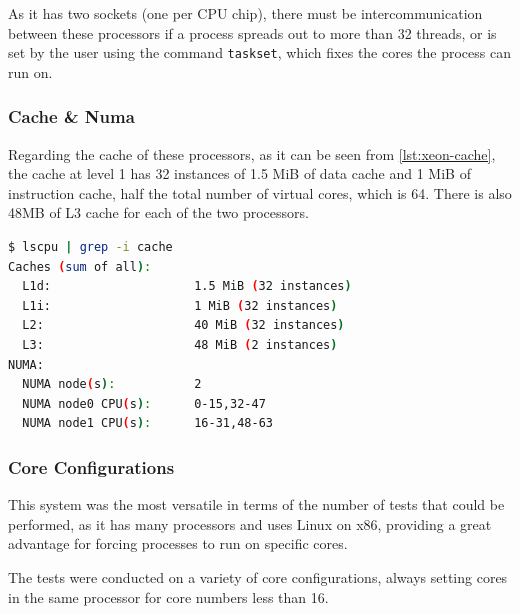 As it has two sockets (one per CPU chip), there must be intercommunication between these processors if a process spreads out to more than 32 threads, or is set by the user using the command \texttt{taskset}, which fixes the cores the process can run on.


\subsubsection{Cache \& Numa}
Regarding the cache of these processors, as it can be seen from \autoref{lst:xeon-cache}, the cache at level 1 has 32 instances of 1.5 MiB of data cache and 1 MiB of instruction cache, half the total number of virtual cores, which is 64. There is also 48MB of L3 cache for each of the two processors.

\begin{lstlisting}[language=bash, caption={Cache of the Intel Xeon Gold 6326}, label={lst:xeon-cache}]
$ lscpu | grep -i cache
Caches (sum of all):
  L1d:                    1.5 MiB (32 instances)
  L1i:                    1 MiB (32 instances)
  L2:                     40 MiB (32 instances)
  L3:                     48 MiB (2 instances)
NUMA:
  NUMA node(s):           2
  NUMA node0 CPU(s):      0-15,32-47
  NUMA node1 CPU(s):      16-31,48-63
\end{lstlisting}

\subsubsection{Core Configurations}

This system was the most versatile in terms of the number of tests that could be performed, as it has many processors and uses Linux on x86, providing a great advantage for forcing processes to run on specific cores.

The tests were conducted on a variety of core configurations, always setting cores in the same processor for core numbers less than 16.


